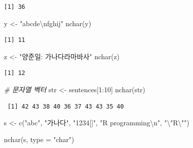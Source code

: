 \documentclass[
  11pt,
]{krantz}
\newenvironment{Shaded}{\begin{snugshade}}{\end{snugshade}}
\newcommand{\AttributeTok}[1]{\textcolor[rgb]{0.61,0.61,0.61}{#1}}
\newcommand{\CommentTok}[1]{\textcolor[rgb]{0.37,0.37,0.37}{\textit{#1}}}
\newcommand{\DecValTok}[1]{\textcolor[rgb]{0.06,0.06,0.06}{#1}}
\newcommand{\FunctionTok}[1]{\textcolor[rgb]{0,0,0}{#1}}
\newcommand{\NormalTok}[1]{#1}
\newcommand{\OtherTok}[1]{\textcolor[rgb]{0.37,0.37,0.37}{#1}}
\newcommand{\SpecialCharTok}[1]{\textcolor[rgb]{0,0,0}{#1}}
\newcommand{\StringTok}[1]{\textcolor[rgb]{0.5,0.5,0.5}{#1}}
\begin{document}
\begin{verbatim}
[1] 36
\end{verbatim}

\begin{Shaded}
\begin{Highlighting}[]
\NormalTok{y }\OtherTok{\textless{}{-}} \StringTok{"abcde}\SpecialCharTok{\textbackslash{}n}\StringTok{fghij"}
\FunctionTok{nchar}\NormalTok{(y)}
\end{Highlighting}
\end{Shaded}

\begin{verbatim}
[1] 11
\end{verbatim}

\begin{Shaded}
\begin{Highlighting}[]
\NormalTok{z }\OtherTok{\textless{}{-}} \StringTok{"양준일: 가나다라마바사"}
\FunctionTok{nchar}\NormalTok{(z)}
\end{Highlighting}
\end{Shaded}

\begin{verbatim}
[1] 12
\end{verbatim}

\begin{Shaded}
\begin{Highlighting}[]
\CommentTok{\# 문자열 벡터}
\NormalTok{str }\OtherTok{\textless{}{-}}\NormalTok{ sentences[}\DecValTok{1}\SpecialCharTok{:}\DecValTok{10}\NormalTok{]}
\FunctionTok{nchar}\NormalTok{(str)}
\end{Highlighting}
\end{Shaded}

\begin{verbatim}
 [1] 42 43 38 40 36 37 43 43 35 40
\end{verbatim}

\begin{Shaded}
\begin{Highlighting}[]
\NormalTok{s }\OtherTok{\textless{}{-}} \FunctionTok{c}\NormalTok{(}\StringTok{"abc"}\NormalTok{, }\StringTok{"가나다"}\NormalTok{, }\StringTok{"1234[]"}\NormalTok{, }\StringTok{"R programming}\SpecialCharTok{\textbackslash{}n}\StringTok{"}\NormalTok{, }\StringTok{"}\SpecialCharTok{\textbackslash{}"}\StringTok{R}\SpecialCharTok{\textbackslash{}"}\StringTok{"}\NormalTok{)}

\FunctionTok{nchar}\NormalTok{(s, }\AttributeTok{type =} \StringTok{"char"}\NormalTok{)}
\end{Highlighting}
\end{Shaded}
\end{document}
